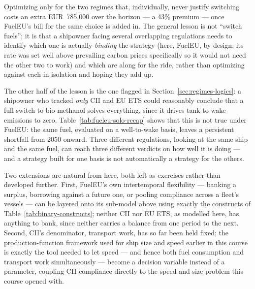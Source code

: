 Optimizing only for the two regimes that, individually, never justify
switching costs an extra EUR~785{,}000 over the horizon --- a
43\% premium --- once FuelEU's bill for the same choice is added in. The
general lesson is not ``switch fuels''; it is that a shipowner facing
several overlapping regulations needs to identify which one is actually
\emph{binding} the strategy (here, FuelEU, by design: its rate was set
well above prevailing carbon prices specifically so it would not need
the other two to work) and which are along for the ride, rather than
optimizing against each in isolation and hoping they add up.

The other half of the lesson is the one flagged in
Section~\ref{sec:regimes-logics}: a shipowner who tracked \emph{only}
CII and EU ETS could reasonably conclude that a full switch to
bio-methanol solves everything, since it drives tank-to-wake emissions
to zero. Table~\ref{tab:fueleu-solo-recap} shows that this is not true
under FuelEU: the same fuel, evaluated on a well-to-wake basis, leaves a
persistent shortfall from 2050 onward. Three different regulations,
looking at the same ship and the same fuel, can reach three different
verdicts on how well it is doing --- and a strategy built for one basis
is not automatically a strategy for the others.

Two extensions are natural from here, both left as exercises rather than
developed further. First, FuelEU's own intertemporal flexibility ---
banking a surplus, borrowing against a future one, or pooling compliance
across a fleet's vessels --- can be layered onto its sub-model above
using exactly the constructs of Table~\ref{tab:binary-constructs};
neither CII nor EU ETS, as modelled here, has anything to bank, since
neither carries a balance from one period to the next. Second, CII's
denominator, transport work, has so far been held fixed; the production-function
framework used for ship size and speed earlier in this course is exactly the tool
needed to let speed --- and hence both fuel consumption and transport work
simultaneously --- become a decision variable instead of a parameter,
coupling CII compliance directly to the speed-and-size problem this
course opened with.


